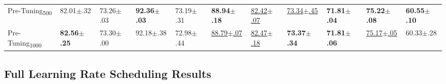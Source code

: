 \documentclass{article} %
\begin{document}
\begin{center}
\begin{sideways}
\begin{minipage}{0.9\textheight}
\begin{tabular}{lllllllllll}
            Pre-Tuning\textsubscript{500}  & 82.01$\pm$.32           & 73.26$\pm$.03           & \bfseries 92.36$\pm$.03 & 73.19$\pm$.31            & \bfseries 88.94$\pm$.18   & \underline{82.42$\pm$.07} & \underline{73.34$\pm$.45} & \bfseries 71.81$\pm$.04  & \bfseries 75.22$\pm$.08   & \bfseries 60.55$\pm$.10  \\
            Pre-Tuning\textsubscript{1000} & \bfseries 82.56$\pm$.25 & 73.30$\pm$.00           & 92.18$\pm$.38           & 72.98$\pm$.44            & \underline{88.79$\pm$.07} & \underline{82.47$\pm$.18} & \bfseries 73.37$\pm$.34   & \bfseries 71.81$\pm$.06  & \underline{75.17$\pm$.05} & 60.33$\pm$.28            \\
            \bottomrule
         \end{tabular}
      \end{minipage}
   \end{sideways}
\end{center}

\newpage
\subsection{Full Learning Rate Scheduling Results}\label{app:scheduling_results}

\vfill
\end{document}
